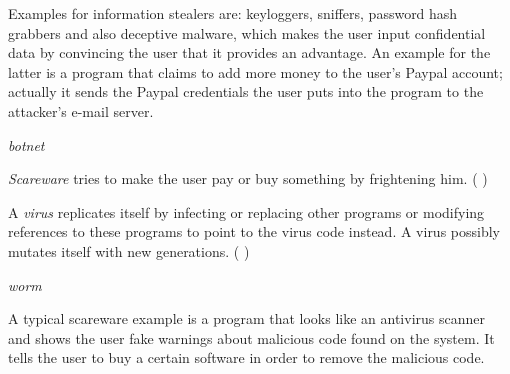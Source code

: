 Examples for information stealers are: keyloggers, sniffers, password hash grabbers \cite[]{sikorski12} and also deceptive malware, which makes the user input confidential data by convincing the user that it provides an advantage. An example for the latter is a program that claims to add more money to the user's Paypal account; actually it sends the Paypal credentials the user puts into the program to the attacker's e-mail server.

\begin{definition}[Botnet]
\emph{botnet}  
\end{definition} 

\begin{definition}
\emph{Scareware} tries to make the user pay or buy something by frightening him. (\cf{} \cite[]{sikorski12})
\end{definition} 

\begin{definition}[Virus]
A \emph{virus} replicates itself by infecting or replacing other programs or modifying references to these programs to point to the virus code instead. A virus possibly mutates itself with new generations. (\cf{} \cite[]{szor05})
\end{definition} 

\begin{definition}[Worm]
\emph{worm}  
\end{definition} 



A typical scareware example is a program that looks like an antivirus scanner and shows the user fake warnings about malicious code found on the system. It tells the user to buy a certain software in order to remove the malicious code.
